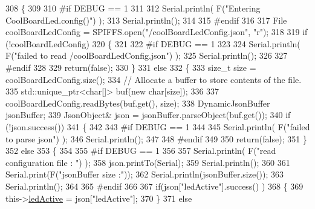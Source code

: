 \begin{DoxyCode}
308 \{
309 
310 \textcolor{preprocessor}{#if DEBUG == 1 }
311         
312     Serial.println( F(\textcolor{stringliteral}{"Entering CoolBoardLed.config()"}) );
313     Serial.println();
314 
315 \textcolor{preprocessor}{#endif}
316     
317     File coolBoardLedConfig = SPIFFS.open(\textcolor{stringliteral}{"/coolBoardLedConfig.json"}, \textcolor{stringliteral}{"r"});
318 
319     \textcolor{keywordflow}{if} (!coolBoardLedConfig) 
320     \{
321     
322 \textcolor{preprocessor}{    #if DEBUG == 1}
323 
324         Serial.println( F(\textcolor{stringliteral}{"failed to read /coolBoardLedConfig.json"}) );
325         Serial.println();
326 
327 \textcolor{preprocessor}{    #endif}
328 
329         \textcolor{keywordflow}{return}(\textcolor{keyword}{false});
330     \}
331     \textcolor{keywordflow}{else}
332     \{
333         \textcolor{keywordtype}{size\_t} size = coolBoardLedConfig.size();
334         \textcolor{comment}{// Allocate a buffer to store contents of the file.}
335         std::unique\_ptr<char[]> buf(\textcolor{keyword}{new} \textcolor{keywordtype}{char}[size]);
336 
337         coolBoardLedConfig.readBytes(buf.get(), size);
338         DynamicJsonBuffer jsonBuffer;
339         JsonObject& json = jsonBuffer.parseObject(buf.get());
340         \textcolor{keywordflow}{if} (!json.success()) 
341         \{
342         
343 \textcolor{preprocessor}{        #if DEBUG == 1}
344 
345             Serial.println( F(\textcolor{stringliteral}{"failed to parse json"}) );
346             Serial.println();
347         
348 \textcolor{preprocessor}{        #endif}
349 
350             \textcolor{keywordflow}{return}(\textcolor{keyword}{false});
351         \} 
352         \textcolor{keywordflow}{else}
353         \{
354         
355 \textcolor{preprocessor}{        #if DEBUG == 1}
356     
357             Serial.println( F(\textcolor{stringliteral}{"read configuration file : "}) );
358             json.printTo(Serial);
359             Serial.println();
360             
361             Serial.print(F(\textcolor{stringliteral}{"jsonBuffer size :"}));
362             Serial.println(jsonBuffer.size());
363             Serial.println();
364 
365 \textcolor{preprocessor}{        #endif}
366   
367             \textcolor{keywordflow}{if}(json[\textcolor{stringliteral}{"ledActive"}].success() )
368             \{
369                 this->\hyperlink{class_cool_board_led_aadd04d2ecf123247718d77f42fba7f08}{ledActive} = json[\textcolor{stringliteral}{"ledActive"}]; 
370             \}
371             \textcolor{keywordflow}{else}

\end{DoxyCode}
